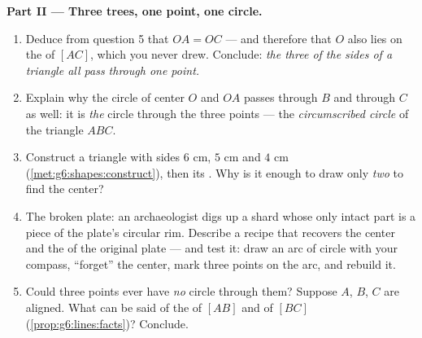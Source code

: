 \begin{problem}
\medskip
\noindent\textbf{Part II --- Three trees, one point, one
circle.}
\begin{enumerate}[resume]
  \item Deduce from question 5 that $OA = OC$ --- and therefore
        that $O$ also lies on the  of
        $[AC]$, which you never drew. Conclude: \emph{the three
         of the sides of a triangle all
        pass through one point.}
  \item Explain why the circle of center $O$ and  $OA$
        passes through $B$ and through $C$ as well: it is
        \emph{the} circle through the three points --- the
        \emph{circumscribed circle}
        of the triangle $ABC$.
  \item Construct a triangle with sides $6$ cm, $5$ cm and
        $4$ cm (\cref{met:g6:shapes:construct}), then its
        . Why is it enough to draw only
        \emph{two}  to find the center?
  \item The broken plate: an archaeologist digs up a shard whose
        only intact part is a piece of the plate's circular rim.
        Describe a recipe that recovers the center and the
         of the original plate --- and test it: draw an
        arc of circle with your compass, ``forget'' the center,
        mark three points on the arc, and rebuild it.
  \item Could three points ever have \emph{no} circle through
        them? Suppose $A$, $B$, $C$ are aligned. What can be
        said of the  of $[AB]$ and of
        $[BC]$ (\cref{prop:g6:lines:facts})? Conclude.
\end{enumerate}


\end{problem}
